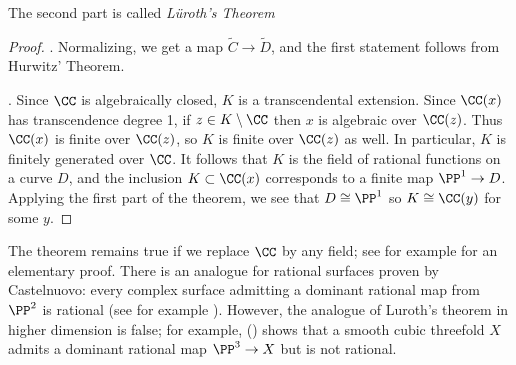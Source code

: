 The second part is called \emph{L\"uroth's Theorem}
 
\begin{proof}
. Normalizing, we get a map  $ \tilde C \to \tilde D$, and the first statement follows from Hurwitz' Theorem.

\medbreak

. Since $\CC$ is algebraically closed, $K$ is a transcendental extension. Since $\CC(x)$ has
transcendence degree 1, if $z\in K\setminus \CC$
then $x$ is algebraic over $\CC(z)$. Thus $\CC(x)$ is finite over $\CC(z)$, so $K$ is finite over $\CC(z)$
as well. In particular, $K$ is finitely generated over $\CC$. It follows that $K$ is the field of rational functions
on a curve $D$, and the inclusion $K\subset \CC(x)$ corresponds to a finite map $\PP^1\to D$. Applying
the first part of the theorem, we see that $D\cong \PP^1$ so $K \cong \CC(y)$ for some $y$.
\end{proof}
 
\begin{fact}
The theorem remains true if we replace $\CC$ by any  field; see for example \cite[Section 8.13]{JacobsonII} for an elementary proof.
There is an analogue for rational surfaces proven by Castelnuovo: every complex surface admitting a dominant rational
map from $\PP^2$ is rational (see for example \cite[Corollary V.5]{Beauville}). However, the analogue of Luroth's theorem in higher dimension is false; for example, (\cite{MR0302652}) shows that a smooth cubic threefold $X$ admits a dominant rational map $\PP^3 \to X$ but is not rational.
\end{fact}


